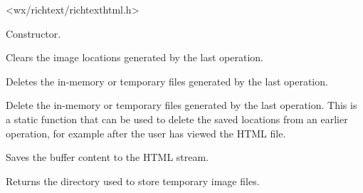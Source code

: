 


<wx/richtext/richtexthtml.h>



\label{wxrichtexthtmlhandlerwxrichtexthtmlhandler}


Constructor.

\label{wxrichtexthtmlhandlercleartemporaryimagelocations}


Clears the image locations generated by the last operation.

\label{wxrichtexthtmlhandlerdeletetemporaryimages}


Deletes the in-memory or temporary files generated by the last operation.


Delete the in-memory or temporary files generated by the last operation. This is a static
function that can be used to delete the saved locations from an earlier operation,
for example after the user has viewed the HTML file.

\label{wxrichtexthtmlhandlerdosavefile}


Saves the buffer content to the HTML stream.

\label{wxrichtexthtmlhandlergettempdir}


Returns the directory used to store temporary image files.

